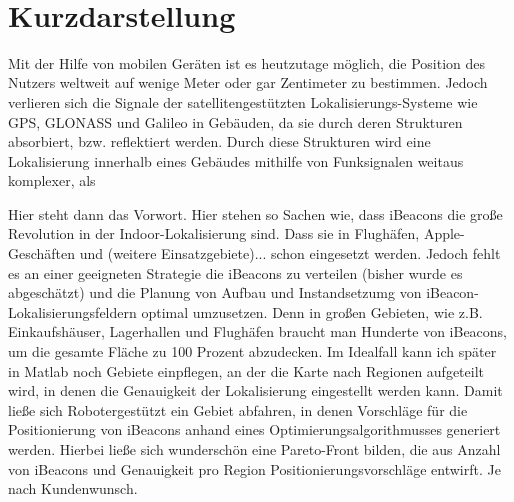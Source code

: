 \maketitle 
\newpage\thispagestyle{empty}~
\newpage
\setcounter{tocdepth}{2}

\section*{Kurzdarstellung}
Mit der Hilfe von mobilen Geräten ist es heutzutage möglich, die Position des Nutzers weltweit auf wenige Meter oder gar Zentimeter zu bestimmen. Jedoch verlieren sich die Signale der satellitengestützten Lokalisierungs-Systeme wie GPS, GLONASS und Galileo in Gebäuden, da sie durch deren Strukturen absorbiert, bzw. reflektiert werden. Durch diese Strukturen wird eine Lokalisierung innerhalb eines Gebäudes mithilfe von Funksignalen weitaus komplexer, als   


Hier steht dann das Vorwort. Hier stehen so Sachen wie, dass iBeacons die große Revolution in der Indoor-Lokalisierung sind. Dass sie in Flughäfen, Apple-Geschäften und (weitere Einsatzgebiete)... schon eingesetzt werden. Jedoch fehlt es an einer geeigneten Strategie die iBeacons zu verteilen (bisher wurde es abgeschätzt) und die Planung von Aufbau und Instandsetzumg von iBeacon-Lokalisierungsfeldern optimal umzusetzen. Denn in großen Gebieten, wie z.B. Einkaufshäuser, Lagerhallen und Flughäfen braucht man Hunderte von iBeacons, um die gesamte Fläche zu 100 Prozent abzudecken. Im Idealfall kann ich später in Matlab noch Gebiete einpflegen, an der die Karte nach Regionen aufgeteilt wird, in denen die Genauigkeit der Lokalisierung eingestellt werden kann. Damit ließe sich Robotergestützt ein Gebiet abfahren, in denen Vorschläge für die Positionierung von iBeacons anhand eines Optimierungsalgorithmusses generiert werden. Hierbei ließe sich wunderschön eine Pareto-Front bilden, die aus Anzahl von iBeacons und Genauigkeit pro Region Positionierungsvorschläge entwirft. Je nach Kundenwunsch. 